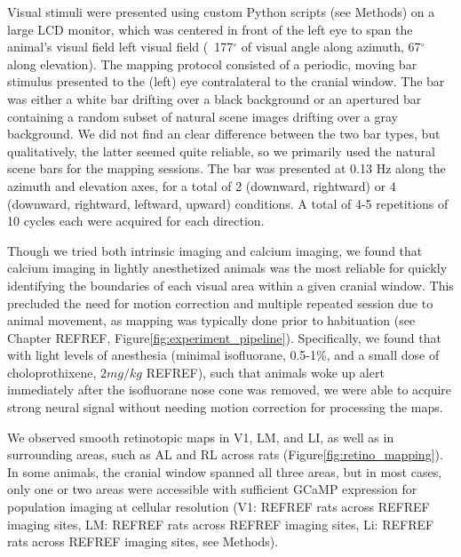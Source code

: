 Visual stimuli were presented using custom Python scripts (see Methods) on a large LCD monitor, which was centered in front of the left eye to span the animal's visual field left visual field (~177$^{\circ}$ of visual angle along azimuth, 67$^{\circ}$ along elevation). The mapping protocol consisted of a periodic, moving bar stimulus\cite{Kalatsky2003, Marshel2011} presented to the (left) eye contralateral to the cranial window. The bar was either a white bar drifting over a black background or an apertured bar containing a random subset of natural scene images drifting over a gray background. We did not find an clear difference between the two bar types, but qualitatively, the latter seemed quite reliable, so we primarily used the natural scene bars for the mapping sessions. The bar was presented at 0.13 Hz along the azimuth and elevation axes, for a total of 2 (downward, rightward) or 4 (downward, rightward, leftward, upward) conditions. A total of 4-5 repetitions of 10 cycles each were acquired for each direction. 

Though we tried both intrinsic imaging and calcium imaging, we found that calcium imaging in lightly anesthetized animals was the most reliable for quickly identifying the boundaries of each visual area within a given cranial window. This precluded the need for motion correction and multiple repeated session due to animal movement, as mapping was typically done prior to habituation (see Chapter REFREF, Figure\ref{fig:experiment_pipeline}). Specifically, we found that with light levels of anesthesia (minimal isofluorane, 0.5-1\%, and a small dose of choloprothixene, $2mg/kg$ REFREF), such that animals woke up alert immediately after the isofluorane nose cone was removed, we were able to acquire strong neural signal without needing motion correction for processing the maps.

We observed smooth retinotopic maps in  V1, LM, and LI, as well as in surrounding areas, such as AL and RL across rats (Figure\ref{fig:retino_mapping}). In some animals, the cranial window spanned all three areas, but in most cases, only one or two areas were accessible with sufficient GCaMP expression for population imaging at cellular resolution (V1: REFREF rats across REFREF imaging sites, LM: REFREF rats across REFREF imaging sites, Li: REFREF rats across REFREF imaging sites, see Methods).

